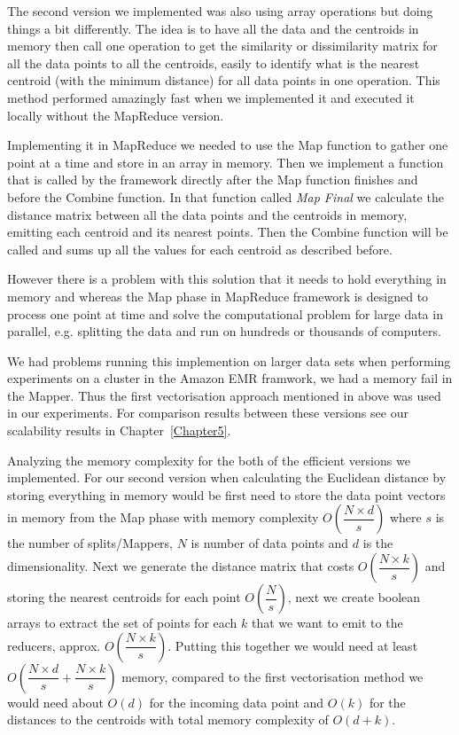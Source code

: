 The second version we implemented was also using array operations but doing things a bit differently. The idea is to have all the data and the centroids in memory then call one operation to get the similarity or dissimilarity matrix for all the data points to all the centroids, easily to identify what is the nearest centroid (with the minimum distance) for all data points in one operation. This method performed amazingly fast when we implemented it and executed it locally without the MapReduce version. 

Implementing it in MapReduce we needed to use the Map function to gather one point at a time and store in an array in memory. Then we implement a function that is called by the framework directly after the Map function finishes and before the Combine function. In that function called \textit{Map Final} we calculate the distance matrix between all the data points and the centroids in memory, emitting each centroid and its nearest points. Then the Combine function will be called and sums up all the values for each centroid as described before. 

However there is a problem with this solution that it needs to hold everything in memory and whereas the Map phase in MapReduce framework is designed to process one point at time and solve the computational problem for large data in parallel, e.g. splitting the data and run on hundreds or thousands of computers.

We had problems running this implemention on larger data sets when performing experiments on a cluster in the Amazon EMR framwork, we had a memory fail in the Mapper. Thus the first vectorisation approach mentioned in above was used in our experiments. For comparison results between these versions see our scalability results in Chapter~\ref{Chapter5}. 

Analyzing the memory complexity for the both of the efficient versions we implemented. For our second version when calculating the Euclidean distance by storing everything in memory would be first need to store the data point vectors in memory from the Map phase with memory complexity $O(\dfrac{N \times d}{s})$ where $s$ is the number of splits/Mappers, $N$ is number of data points and $d$ is the dimensionality. Next we generate the distance matrix that costs $O(\dfrac{N \times k}{s})$ and storing the nearest centroids for each point $O(\dfrac{N}{s})$, next we create boolean arrays to extract the set of points for each $k$ that we want to emit to the reducers, approx. $O(\dfrac{N \times k}{s})$. Putting this together we would need at least $O(\dfrac{N \times d}{s} + \dfrac{N \times k}{s})$ memory, compared to the first vectorisation method we would need about $O(d)$ for the incoming data point and $O(k)$ for the distances to the centroids with total memory complexity of $O(d + k)$.


